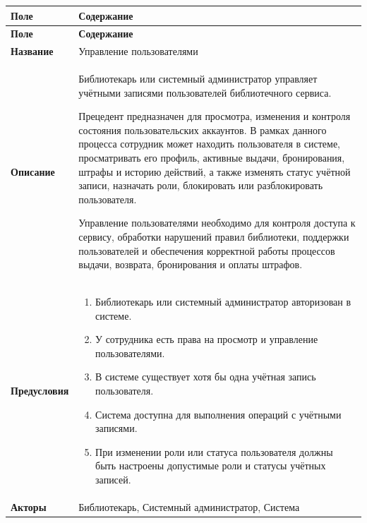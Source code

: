 \documentclass[12pt,a4paper]{article}
\begin{document}
	\begin{xltabular}{\textwidth}{
			|>{\raggedright\arraybackslash}p{2.7cm}
			|>{\raggedright\arraybackslash}X|
		}
		\hline
		\textbf{Поле} & \textbf{Содержание} \\
		\hline
		\endfirsthead
		
		\hline
		\textbf{Поле} & \textbf{Содержание} \\
		\hline
		\endhead
		
		\hline
		\endfoot
		
		\textbf{Название} &
		Управление пользователями \\
		\hline
		
		\textbf{Описание} &
		Библиотекарь или системный администратор управляет учётными
		записями пользователей библиотечного сервиса.
		
		Прецедент предназначен для просмотра, изменения и контроля
		состояния пользовательских аккаунтов. В рамках данного процесса
		сотрудник может находить пользователя в системе, просматривать его
		профиль, активные выдачи, бронирования, штрафы и историю действий,
		а также изменять статус учётной записи, назначать роли, блокировать
		или разблокировать пользователя.
		
		Управление пользователями необходимо для контроля доступа к сервису,
		обработки нарушений правил библиотеки, поддержки пользователей и
		обеспечения корректной работы процессов выдачи, возврата,
		бронирования и оплаты штрафов. \\
		\hline
		
		\textbf{Предусловия} &
		\begin{enumerate}
			\item Библиотекарь или системный администратор авторизован в системе.
			\item У сотрудника есть права на просмотр и управление пользователями.
			\item В системе существует хотя бы одна учётная запись пользователя.
			\item Система доступна для выполнения операций с учётными записями.
			\item При изменении роли или статуса пользователя должны быть
			настроены допустимые роли и статусы учётных записей.
		\end{enumerate} \\
		\hline
		
		\textbf{Акторы} &
		Библиотекарь, Системный администратор, Система \\
		\hline
		

\end{xltabular}
\end{document}
